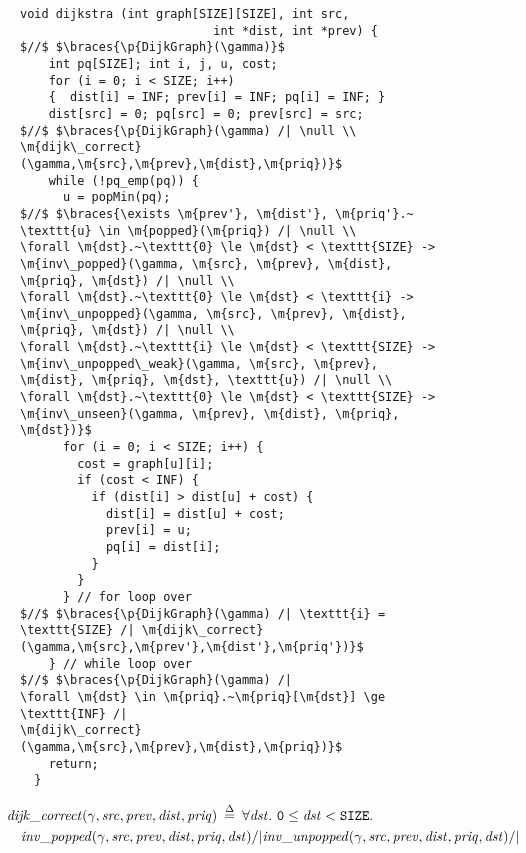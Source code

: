
\begin{figure}
\begin{lstlisting}[mathescape=true]
  void dijkstra (int graph[SIZE][SIZE], int src, 
                           int *dist, int *prev) {
$//$ $\braces{\p{DijkGraph}(\gamma)}$
    int pq[SIZE]; int i, j, u, cost;
    for (i = 0; i < SIZE; i++) 
    {  dist[i] = INF; prev[i] = INF; pq[i] = INF; }
    dist[src] = 0; pq[src] = 0; prev[src] = src;
$//$ $\braces{\p{DijkGraph}(\gamma) /| \null \\
\m{dijk\_correct}(\gamma,\m{src},\m{prev},\m{dist},\m{priq})}$
    while (!pq_emp(pq)) {
      u = popMin(pq);
$//$ $\braces{\exists \m{prev'}, \m{dist'}, \m{priq'}.~ \texttt{u} \in \m{popped}(\m{priq}) /| \null \\
\forall \m{dst}.~\texttt{0} \le \m{dst} < \texttt{SIZE} -> \m{inv\_popped}(\gamma, \m{src}, \m{prev}, \m{dist}, \m{priq}, \m{dst}) /| \null \\
\forall \m{dst}.~\texttt{0} \le \m{dst} < \texttt{i} -> \m{inv\_unpopped}(\gamma, \m{src}, \m{prev}, \m{dist}, \m{priq}, \m{dst}) /| \null \\
\forall \m{dst}.~\texttt{i} \le \m{dst} < \texttt{SIZE} -> \m{inv\_unpopped\_weak}(\gamma, \m{src}, \m{prev}, \m{dist}, \m{priq}, \m{dst}, \texttt{u}) /| \null \\
\forall \m{dst}.~\texttt{0} \le \m{dst} < \texttt{SIZE} -> \m{inv\_unseen}(\gamma, \m{prev}, \m{dist}, \m{priq}, \m{dst})}$
      for (i = 0; i < SIZE; i++) {
        cost = graph[u][i]; 
        if (cost < INF) {
          if (dist[i] > dist[u] + cost) {
            dist[i] = dist[u] + cost;
            prev[i] = u; 
            pq[i] = dist[i];
          }
        }  
      } // for loop over
$//$ $\braces{\p{DijkGraph}(\gamma) /| \texttt{i} = \texttt{SIZE} /| \m{dijk\_correct}(\gamma,\m{src},\m{prev'},\m{dist'},\m{priq'})}$
    } // while loop over
$//$ $\braces{\p{DijkGraph}(\gamma) /|
\forall \m{dst} \in \m{priq}.~\m{priq}[\m{dst}] \ge \texttt{INF} /| 
\m{dijk\_correct}(\gamma,\m{src},\m{prev},\m{dist},\m{priq})}$
    return;
  }
\end{lstlisting}
\vspace{-1.5em}
\begin{equation*}
\begin{split}
&\!\!\!\!\!\!\m{dijk\_correct}(\gamma, \m{src}, \m{prev}, \m{dist}, \m{priq}) \; \defeq \; \forall \m{dst}.~\texttt{0} \le \m{dst} < \texttt{SIZE}. \\
&\m{inv\_popped}(\gamma, \m{src}, \m{prev}, \m{dist}, \m{priq}, \m{dst}) /|
\m{inv\_unpopped}(\gamma, \m{src}, \m{prev}, \m{dist}, \m{priq}, \m{dst}) /| 

\end{split}
\end{equation*}
\end{figure}
